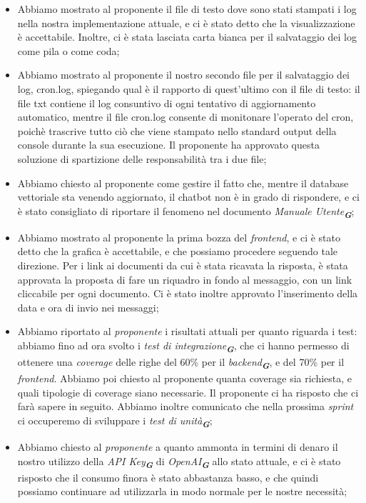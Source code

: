 \begin{itemize}
    \item Abbiamo mostrato al proponente il file di testo dove sono stati stampati i log nella nostra implementazione attuale, e ci è stato detto che la visualizzazione è accettabile. Inoltre, ci è stata lasciata carta bianca per il salvataggio dei log come pila o come coda;
    \item Abbiamo mostrato al proponente il nostro secondo file per il salvataggio dei log, cron.log, spiegando qual è il rapporto di quest'ultimo con il file di testo: il file txt contiene il log consuntivo di ogni tentativo di aggiornamento automatico, mentre il file cron.log consente di monitonare l'operato del cron, poichè trascrive tutto ciò che viene stampato nello standard output della console durante la sua esecuzione. Il proponente ha approvato questa soluzione di spartizione delle responsabilità tra i due file;
    \item Abbiamo chiesto al proponente come gestire il fatto che, mentre il database vettoriale sta venendo aggiornato, il chatbot non è in grado di rispondere, e ci è stato consigliato di riportare il fenomeno nel documento \emph{Manuale Utente}\textsubscript{\textbf{\textit{G}}};
    \item Abbiamo mostrato al proponente la prima bozza del \emph{frontend}, e ci è stato detto che la grafica è accettabile, e che possiamo procedere seguendo tale direzione. Per i link ai documenti da cui è stata ricavata la risposta, è stata approvata la proposta di fare un riquadro in fondo al messaggio, con un link cliccabile per ogni documento. Ci è stato inoltre approvato l'inserimento della data e ora di invio nei messaggi;
    \item Abbiamo riportato al \emph{proponente} i risultati attuali per quanto riguarda i test: abbiamo fino ad ora svolto i \emph{test di integrazione}\textsubscript{\textbf{\textit{G}}}, che ci hanno permesso di ottenere una \emph{coverage} delle righe del 60\% per il \emph{backend}\textsubscript{\textbf{\textit{G}}}, e del 70\% per il \emph{frontend}. Abbiamo poi chiesto al proponente quanta coverage sia richiesta, e quali tipologie di coverage siano necessarie. Il proponente ci ha risposto che ci farà sapere in seguito. Abbiamo inoltre comunicato che nella prossima \emph{sprint} ci occuperemo di sviluppare i \emph{test di unità}\textsubscript{\textbf{\textit{G}}};
    \item Abbiamo chiesto al \emph{proponente} a quanto ammonta in termini di denaro il nostro utilizzo della \emph{API Key}\textsubscript{\textbf{\textit{G}}} di \emph{OpenAI}\textsubscript{\textbf{\textit{G}}} allo stato attuale, e ci è stato risposto che il consumo finora è stato abbastanza basso, e che quindi possiamo continuare ad utilizzarla in modo normale per le nostre necessità;

\end{itemize}
